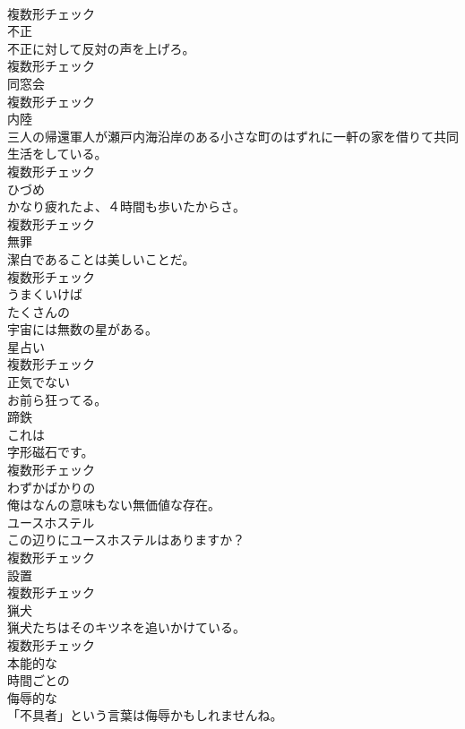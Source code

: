 \documentclass[8pt]{extreport}
\begin{document}
\begin{CJK}{UTF8}{min}
\\	複数形チェック
\\	[名詞]	不正	
\\	不正に対して反対の声を上げろ。	
\\	複数形チェック
\\	[名詞]	同窓会	
\\	複数形チェック
\\	[名詞]	内陸	
\\	三人の帰還軍人が瀬戸内海沿岸のある小さな町のはずれに一軒の家を借りて共同生活をしている。	
\\	複数形チェック
\\	[名詞]	ひづめ	
\\	かなり疲れたよ、４時間も歩いたからさ。	
\\	複数形チェック
\\	[名詞]	無罪	
\\	潔白であることは美しいことだ。	
\\	複数形チェック
\\	[副詞]	うまくいけば	
\\	[形容詞]	たくさんの	
\\	宇宙には無数の星がある。	
\\	[名詞]	星占い	
\\	複数形チェック
\\	[形容詞]	正気でない	
\\	お前ら狂ってる。	
\\	[名詞]	蹄鉄	
\\	これは
\\	字形磁石です。	
\\	複数形チェック
\\	[形容詞]	わずかばかりの	
\\	俺はなんの意味もない無価値な存在。	
\\	[名詞]	ユースホステル	
\\	この辺りにユースホステルはありますか？	
\\	複数形チェック
\\	[名詞]	設置	
\\	複数形チェック
\\	[名詞]	猟犬	
\\	猟犬たちはそのキツネを追いかけている。	
\\	複数形チェック
\\	[形容詞]	本能的な	
\\	[形容詞]	時間ごとの	
\\	[形容詞]	侮辱的な	
\\	「不具者」という言葉は侮辱かもしれませんね。	

\end{CJK}
\end{document}
